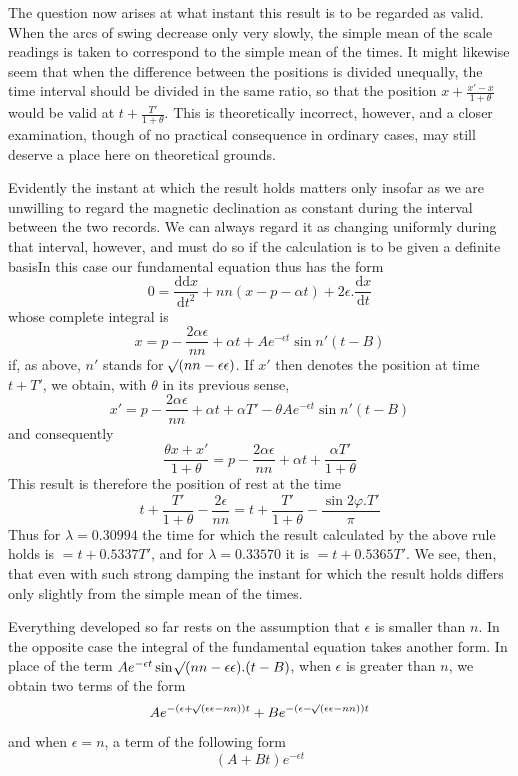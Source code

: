 The question now arises at what instant this result is to be regarded as valid. When the arcs of swing decrease only very slowly, the simple mean of the scale readings is taken to correspond to the simple mean of the times. It might likewise seem that when the difference between the positions is divided unequally, the time interval should be divided in the same ratio, so that the position $x+\frac{x'-x}{1+\theta}$ would be valid at $t+\frac{T'}{1+\theta}$. This is theoretically incorrect, however, and a closer examination, though of no practical consequence in ordinary cases, may still deserve a place here on theoretical grounds.

Evidently the instant at which the result holds matters only insofar as we are unwilling to regard the magnetic declination as constant during the interval between the two records. We can always regard it as changing uniformly during that interval, however, and must do so if the calculation is to be given a definite basis\quad In this case our fundamental equation thus has the form
\[
0=\frac{\mathrm{d}\mathrm{d}x}{\mathrm{d}t^2}+nn(x-p-\alpha t)+2\epsilon.\frac{\mathrm{d}x}{\mathrm{d}t}
\]
whose complete integral is
\[
x=p-\frac{2\alpha\epsilon}{nn}+\alpha t+Ae^{-\epsilon t}\sin n'(t-B)
\]
if, as above, $n'$ stands for $\mathord{{}^{}\!\surd}(nn-\epsilon\epsilon)$. If $x'$ then denotes the position at time $t+T'$, we obtain, with $\theta$ in its previous sense,
\[
x'=p-\frac{2\alpha\epsilon}{nn}+\alpha t+\alpha T'-\theta Ae^{-\epsilon t}\sin n'(t-B)
\]
and consequently
\[
\frac{\theta x+x'}{1+\theta}=p-\frac{2\alpha\epsilon}{nn}+\alpha t+\frac{\alpha T'}{1+\theta}
\]
This result is therefore the position of rest at the time
\[
t+\frac{T'}{1+\theta}-\frac{2\epsilon}{nn}=t+\frac{T'}{1+\theta}-\frac{\sin2\varphi.T'}{\pi}
\]
Thus for $\lambda=0.30994$ the time for which the result calculated by the above rule holds is $=t+0.5337T'$, and for $\lambda=0.33570$ it is $=t+0.5365T'$.
We see, then, that even with such strong damping the instant for which the result holds differs only slightly from the simple mean of the times.

Everything developed so far rests on the assumption that $\epsilon$ is smaller than $n$. In the opposite case the integral of the fundamental equation takes another form. In place of the term $Ae^{-\epsilon t}\sin\mathord{{}^{}\!\surd}(nn-\epsilon\epsilon).(t-B)$, when $\epsilon$ is greater than $n$, we obtain two terms of the form
\[
Ae^{-(\epsilon+\mathord{{}^{}\!\surd}(\epsilon\epsilon-nn))t}+Be^{-(\epsilon-\mathord{{}^{}\!\surd}(\epsilon\epsilon-nn))t}
\]
and when $\epsilon=n$, a term of the following form
\[
(A+Bt)e^{-\epsilon t}
\]

